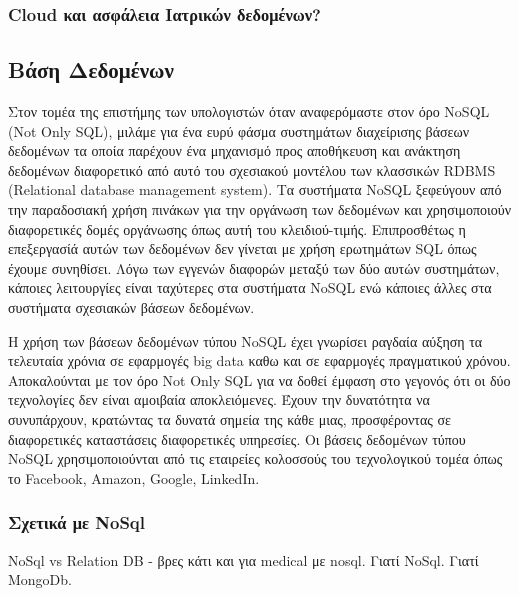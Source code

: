 		\subsubsection{Cloud και ασφάλεια Ιατρικών δεδομένων?}
	\cite{Kaufm2009}	
		
	\subsection{Βάση Δεδομένων}
	Στον τομέα της επιστήμης των υπολογιστών όταν αναφερόμαστε στον όρο NoSQL (Not Only SQL), μιλάμε για ένα ευρύ φάσμα συστημάτων διαχείρισης βάσεων δεδομένων τα οποία παρέχουν ένα μηχανισμό προς αποθήκευση και ανάκτηση δεδομένων διαφορετικό από αυτό του σχεσιακού μοντέλου των κλασσικών RDBMS (Relational database management system). Τα συστήματα NoSQL ξεφεύγουν από την παραδοσιακή χρήση πινάκων για την οργάνωση των δεδομένων και χρησιμοποιούν διαφορετικές δομές οργάνωσης όπως αυτή του κλειδιού-τιμής. Επιπροσθέτως η επεξεργασίά αυτών των δεδομένων δεν γίνεται με χρήση ερωτημάτων SQL όπως έχουμε συνηθίσει. Λόγω των εγγενών διαφορών μεταξύ των δύο αυτών συστημάτων, κάποιες λειτουργίες είναι ταχύτερες στα συστήματα NoSQL ενώ κάποιες άλλες στα συστήματα σχεσιακών βάσεων δεδομένων.
	
	Η χρήση των βάσεων δεδομένων τύπου NoSQL έχει γνωρίσει ραγδαία αύξηση τα τελευταία χρόνια σε εφαρμογές big data καθω και σε εφαρμογές πραγματικού χρόνου. Αποκαλούνται με τον όρο Not Only SQL για να δοθεί έμφαση στο γεγονός ότι οι δύο τεχνολογίες δεν είναι αμοιβαία αποκλειόμενες. Έχουν την δυνατότητα να συνυπάρχουν, κρατώντας τα δυνατά σημεία της κάθε μιας, προσφέροντας σε διαφορετικές καταστάσεις διαφορετικές υπηρεσίες. Οι βάσεις δεδομένων τύπου NoSQL χρησιμοποιούνται από τις εταιρείες κολοσσούς του τεχνολογικού τομέα όπως το Facebook, Amazon, Google, LinkedIn.
	
		\subsubsection{Σχετικά με NoSql}
			NoSql vs Relation DB - βρες κάτι και για medical με nosql. Γιατί NoSql. Γιατί MongoDb.
